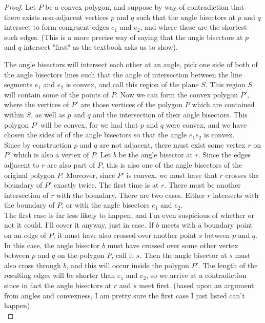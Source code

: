 \documentclass[12pt]{article}
\theoremstyle{definition}
\begin{document}
\begin{proof}

Let $P$ be a convex polygon, and suppose by way of contradiction that there exists non-adjacent vertices $p$ and $q$ such that the angle bisectors at $p$ and $q$ intersect to form congruent edges $e_1$ and $e_2$, and where these are the shortest such edges. (This is a more precise way of saying that the angle bisectors at $p$ and $q$ intersect "first" as the textbook asks us to show).

The angle bisectors will intersect each other at an angle, pick one side of both of the angle bisectors lines such that the angle of intersection between the line segments $e_1$ and $e_2$ is convex, and call this region of the plane $S$. This region $S$ will contain some of the points of $P$. Now we can form the convex polygon $P'$, where the vertices of $P'$ are those vertices of the polygon $P$ which are contained within $S$, as well as $p$ and $q$ and the intersection of their angle bisectors. This polygon $P'$ will be convex, for we had that $p$ and $q$ were convex, and we have chosen the sides of of the angle bisectors so that the angle $e_1e_2$ is convex. \\

Since by construction $p$ and $q$ are not adjacent, there must exist some vertex $r$ on $P'$ which is also a vertex of $P$. Let $b$ be the angle bisector at $r$. Since the edges adjacent to $r$ are also part of $P$, this is also one of the angle bisectors of the original polygon $P$. Moreover, since $P'$ is convex, we must have that $r$ crosses the boundary of $P'$ exactly twice. The first time is at $r$. There must be another intersection of $r$ with the boundary. There are two cases. Either $r$ intersects with the boundary of $P$, or with the angle bisectors $e_1$ and $e_2$.\\

The first case is far less likely to happen, and I'm even suspicious of whether or not it could. I'll cover it anyway, just in case. If $b$ meets with a boundary point on an edge of $P$, it must have also crossed over another point $s$ between $p$ and $q$. In this case, the angle bisector $b$ must have crossed over some other vertex between $p$ and $q$ on the polygon $P$, call it $s$. Then the angle bisector at $s$ must also cross through $b$, and this will occur inside the polygon $P'$. The length of the resulting edges will be shorter than $e_1$ and $e_2$, so we arrive at a contradiction since in fact the angle bisectors at $r$ and $s$ meet first. (based upon an argument from angles and convexness, I am pretty sure the first case I just listed can't happen)\\



\end{proof}
\end{document}
